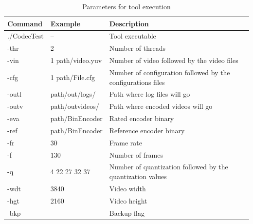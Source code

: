 \documentclass{acm_proc_article-sp}
\begin{document}
\FloatBarrier

\begin{table}[!ht]
\centering
\caption{Parameters for tool execution}
\label{parameter_tool}
\begin{tabular}{|l|l|p{3cm}|l|}
\hline
\textbf{Command} & \textbf{Example}      & \textbf{Description}                                         \\ \hline
./CodecTest      & --                    & Tool executable                                                             \\ \hline
-thr             & 2                     & Number of threads                                            \\ \hline
-vin             & 1 path/video.yuv  & Number of video followed by the video files                  \\ \hline
-cfg             & 1 path/File.cfg & Number of configuration followed by the configurations files \\ \hline
-outl            & path/out/logs/      & Path where log files will go                                 \\ \hline
-outv            & path/outvideos/    & Path where encoded videos will go                            \\ \hline
-eva             & path/BinEncoder    & Rated encoder binary                                         \\ \hline
-ref             & path/BinEncoder    & Reference encoder binary                                     \\ \hline
-fr              & 30                    & Frame rate                                                   \\ \hline
-f               & 130                   & Number of frames                                             \\ \hline
-q             	 & 4 22 27 32 37        & Number of quantization followed by the quantization values   \\ 
\hline
-wdt             & 3840                  & Video width                                                  \\ \hline
-hgt             & 2160                  & Video height                                                 \\ \hline
-bkp             & --                    & Backup flag                                                  \\ \hline
\end{tabular}
\end{table}
\FloatBarrier
\end{document}
